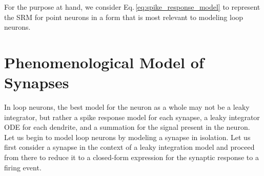 \documentclass[]{article}
\begin{document}
For the purpose at hand, we consider Eq.\,\ref{eq:spike_response_model} to represent the SRM for point neurons in a form that is most relevant to modeling loop neurons.

\section{\label{sec:synapses}Phenomenological Model of Synapses}
In loop neurons, the best model for the neuron as a whole may not be a leaky integrator, but rather a spike response model for each synapse, a leaky integrator ODE for each dendrite, and a summation for the signal present in the neuron. Let us begin to model loop neurons by modeling a synapse in isolation. Let us first consider a synapse in the context of a leaky integration model and proceed from there to reduce it to a closed-form expression for the synaptic response to a firing event. 
\end{document}
